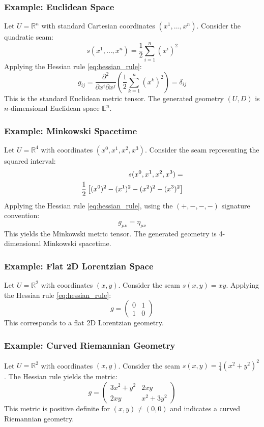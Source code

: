 \documentclass[twoside,twocolumn]{article}
\begin{document}
\subsubsection{Example: Euclidean Space}
Let $U = \mathbb{R}^n$ with standard Cartesian coordinates $(x^1, \dots, x^n)$. Consider the quadratic seam:
$$ s(x^1, \dots, x^n) = \frac{1}{2} \sum_{i=1}^n (x^i)^2 $$
Applying the Hessian rule \eqref{eq:hessian_rule}:
$$ g_{ij} = \frac{\partial^2}{\partial x^i \partial x^j} \left( \frac{1}{2} \sum_{k=1}^n (x^k)^2 \right) = \delta_{ij} $$
This is the standard Euclidean metric tensor. The generated geometry $(U, D)$ is $n$-dimensional Euclidean space $\mathbb{E}^n$.

\subsubsection{Example: Minkowski Spacetime}
Let $U = \mathbb{R}^4$ with coordinates $(x^0, x^1, x^2, x^3)$. Consider the seam representing the squared interval:
\begin{align}
s(x^0, x^1, x^2, x^3) = \notag \\ \frac{1}{2} \left[ (x^0)^2 - (x^1)^2 - (x^2)^2 - (x^3)^2 \right]
\end{align}
Applying the Hessian rule \eqref{eq:hessian_rule}, using the $(+,-,-,-)$ signature convention:
$$ g_{\mu\nu} = \eta_{\mu\nu} $$
This yields the Minkowski metric tensor. The generated geometry is 4-dimensional Minkowski spacetime.

\subsubsection{Example: Flat 2D Lorentzian Space}
Let $U = \mathbb{R}^2$ with coordinates $(x, y)$. Consider the seam $s(x, y) = xy$. Applying the Hessian rule \eqref{eq:hessian_rule}:
$$ g = \begin{pmatrix} 0 & 1 \\ 1 & 0 \end{pmatrix} $$
This corresponds to a flat 2D Lorentzian geometry.

\subsubsection{Example: Curved Riemannian Geometry}
Let $U = \mathbb{R}^2$ with coordinates $(x, y)$. Consider the seam $s(x, y) = \frac{1}{4} (x^2 + y^2)^2$. The Hessian rule yields the metric:
$$ g = \begin{pmatrix} 3x^2+y^2 & 2xy \\ 2xy & x^2+3y^2 \end{pmatrix} $$
This metric is positive definite for $(x,y) \neq (0,0)$ and indicates a curved Riemannian geometry.
\end{document}
